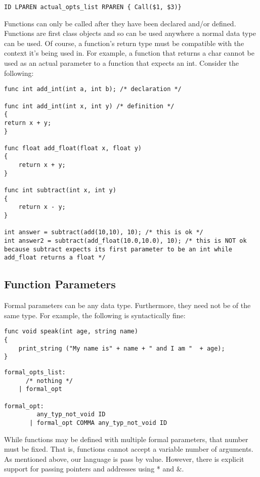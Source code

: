 \documentclass{article}
\begin{document}
\begin{Verbatim}[frame=single]
	 ID LPAREN actual_opts_list RPAREN { Call($1, $3)}
\end{Verbatim}

Functions can only be called after they have been declared and/or defined. Functions are first class objects and so can be used anywhere a normal data type can be used. Of course, a function's return type must be compatible with the context it's being used in. For example, a function that returns a char cannot be used as an actual parameter to a function that expects an int.  Consider the following:

\begin{lstlisting}
func int add_int(int a, int b); /* declaration */

func int add_int(int x, int y) /* definition */
{
return x + y;
}

func float add_float(float x, float y)
{
	return x + y;
}

func int subtract(int x, int y)
{
	return x - y;
}

int answer = subtract(add(10,10), 10); /* this is ok */
int answer2 = subtract(add_float(10.0,10.0), 10); /* this is NOT ok because subtract expects its first parameter to be an int while add_float returns a float */

\end{lstlisting}

\subsection{Function Parameters}
Formal parameters can be any data type. Furthermore, they need not be of the same type. For example, the following is syntactically fine:

\begin{lstlisting}
func void speak(int age, string name)
{
	print_string ("My name is" + name + " and I am "  + age);
}
\end{lstlisting}


\begin{Verbatim}[frame=single]
formal_opts_list:
	  /* nothing */ 
	| formal_opt 

formal_opt:
	     any_typ_not_void ID 		
	   | formal_opt COMMA any_typ_not_void ID 	
\end{Verbatim}


While functions may be defined with multiple formal parameters, that number must be fixed. That is, functions cannot accept a variable number of arguments. As mentioned above, our language is pass by value. However, there is explicit support for passing pointers and addresses using * and $\&$.
\end{document}
